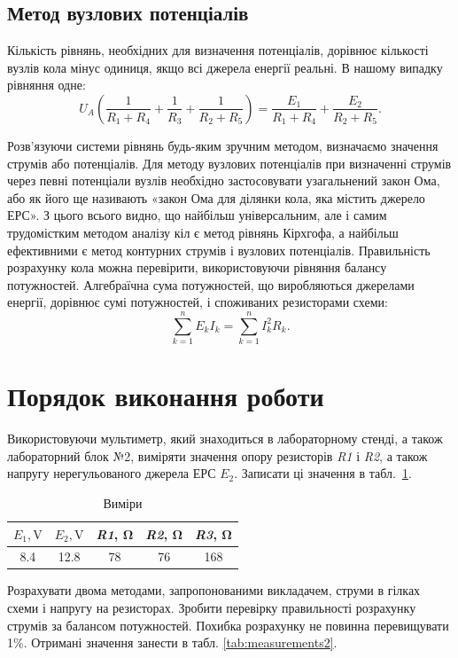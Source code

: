 \documentclass[a4paper,oneside,DIV=10,12pt]{scrartcl}
\newcommand\schel[1]{\textit{#1}}
\begin{document}
		\subsection{Метод вузлових потенціалів}
			Кількість рівнянь, необхідних для визначення потенціалів, дорівнює кількості вузлів кола мінус одиниця, якщо всі джерела енергії реальні. В нашому випадку рівняння одне:
			\[
				U_A \left( \frac{1}{R_1 + R_4} + \frac{1}{R_3} + \frac{1}{R_2 + R_5} \right) = \frac{E_1}{R_1 + R_4} + \frac{E_2}{R_2 + R_5}.
			\]
			
			Розв'язуючи системи рівнянь будь-яким зручним методом, визначаємо значення струмів або потенціалів. Для методу вузлових потенціалів при визначенні струмів через певні потенціали вузлів необхідно застосовувати узагальнений закон Ома, або як його ще називають «закон Ома для ділянки кола, яка містить джерело ЕРС». З цього всього видно, що найбільш універсальним, але і самим трудомістким методом аналізу кіл є метод рівнянь Кірхгофа, а найбільш ефективними є метод контурних струмів і вузлових потенціалів. Правильність розрахунку кола можна перевірити, використовуючи рівняння балансу потужностей. Алгебраїчна сума потужностей, що виробляються джерелами енергії, дорівнює сумі потужностей, і споживаних резисторами схеми:
			\[
				\sum_{k = 1}^{n} E_k I_k = \sum_{k = 1}^n I^2_k R_k.
			\]
		
	\section{Порядок виконання роботи}
		Використовуючи мультиметр, який знаходиться в лабораторному стенді, а також лабораторний блок №2, виміряти значення опору резисторів \schel{R1} і \schel{R2}, а також напругу нерегульованого джерела ЕРС \schel{$E_2$}. Записати ці значення в табл.~\ref{tab:measurements1}.
		
		\begin{table}[!htbp]
			\centering
			\begin{tabular}{ccccc}
				\toprule
				$E_1, \si{\volt}$ & $E_2, \si{\volt}$ & \schel{R1}, \si{\ohm} & \schel{R2}, \si{\ohm} & \schel{R3}, \si{\ohm} \\
				\midrule
				\num{8,4} & \num{12,8} & \num{78} & \num{76} & \num{168} \\
				\bottomrule
			\end{tabular}
			\caption{Виміри}
			\label{tab:measurements1}
		\end{table}
		
		Розрахувати двома методами, запропонованими викладачем, струми в гілках схеми і напругу на резисторах. Зробити перевірку правильності розрахунку струмів за балансом потужностей. Похибка розрахунку не повинна перевищувати 1\%. Отримані значення занести в табл. \ref{tab:measurements2}.
		
\end{document}
